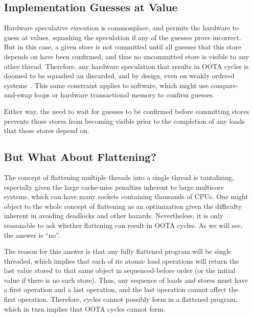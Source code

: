 \documentclass[10]{article}
\begin{document}
\subsection{Implementation Guesses at Value}
\label{sec:Implementation Guesses at Value}

Hardware speculative execution is commonplace, and permits the
hardware to guess at values, squashing the speculation if any
of the guesses prove incorrect.
But in this case, a given store is not committed until all guesses that
this store depends on have been confirmed, and thus no uncommitted store
is visible to any other thread.
Therefore, any hardware speculation that results in OOTA cycles is doomed
to be squashed an discarded, and by design, even on weakly ordered
systems~\cite{ARMv7A:2010,ARMv8A:2017,PowerISA2.07-2013}.
This same constraint applies to software, which might use compare-and-swap
loops or hardware transactional memory to confirm guesses.

Either way, the need to wait for guesses to be confirmed before committing
stores prevents those stores from becoming visible prior to the
completion of any loads that those stores depend on.

\subsection{But What About Flattening?}
\label{sec:But What About Flattening?}

The concept of flattening multiple threads into a single thread is
tantalizing, especially given the large cache-miss penalties inherent
to large multicore systems, which can have many sockets containing
thousands of CPUs.
One might object to the whole concept of flattening as an
optimization given the difficulty inherent in avoiding deadlocks
and other hazards.
Nevertheless, it is only reasonable to ask whether flattening can
result in OOTA cycles.
As we will see, the answer is ``no''.

The reason for this answer is that any fully flattened program will be
single threaded, which implies that each of its atomic load operations
will return the last value stored to that same object in sequenced-before
order (or the initial value if there is no such store).
Thus, any sequence of loads and stores must have a first operation and
a last operation, and the last operation cannot affect the first
operation.
Therefore, cycles cannot possibly form in a flattened program,
which in turn implies that OOTA cycles cannot form.
\end{document}
